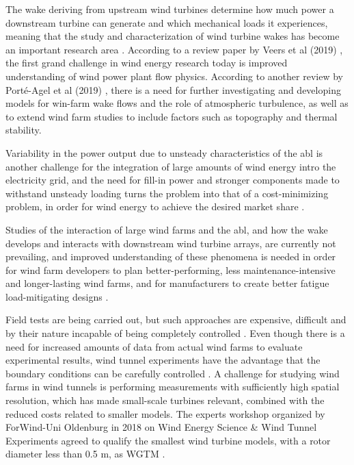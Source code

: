 The wake deriving from upstream wind turbines determine how much power a downstream turbine can generate and which mechanical loads it experiences, meaning that the study and characterization of wind turbine wakes has become an important research area \cite{Neunaber} \cite{Tossas2014}. According to a review paper by Veers et al (2019) \cite{Veers2019}, the first grand challenge in wind energy research today is improved understanding of wind power plant flow physics. According to another review by Porté-Agel et al (2019) \cite{PorteAgel2019}, there is a need for further investigating and developing models for win-farm wake flows and the role of atmospheric turbulence, as well as to extend wind farm studies to include factors such as topography and thermal stability. 

Variability in the power output due to unsteady characteristics of the \gls{abl} is another challenge for the integration of large amounts of wind energy intro the electricity grid, and the need for fill-in power and stronger components made to withstand unsteady loading turns the problem into that of a cost-minimizing problem, in order for wind energy to achieve the desired market share \cite{Bossuyt2016}. 

Studies of the interaction of large wind farms and the \gls{abl}, and how the wake develops and interacts with downstream wind turbine arrays, are currently not prevailing, and improved understanding of these phenomena is needed in order for wind farm developers to plan better-performing, less maintenance-intensive and longer-lasting wind farms, and for manufacturers to create better fatigue load-mitigating designs \cite{Tossas2014} \cite{Aubrun2019}. 


Field tests are being carried out, but such approaches are expensive, difficult and by their nature incapable of being completely controlled \cite{Sforza1981}. Even though there is a need for increased amounts of data from actual wind farms to evaluate experimental results, wind tunnel experiments have the advantage that the boundary conditions can be carefully controlled \cite{Bossuyt2016}. A challenge for studying wind farms in wind tunnels is performing measurements with sufficiently high spatial resolution, which has made small-scale turbines relevant, combined with the reduced costs \cite{Harrison2010} related to smaller models. The experts workshop organized by ForWind-Uni Oldenburg in 2018 on Wind Energy Science \& Wind Tunnel Experiments agreed to qualify the smallest wind turbine models, with a rotor diameter less than 0.5 m, as \gls{WGTM} \cite{Aubrun2019}.

